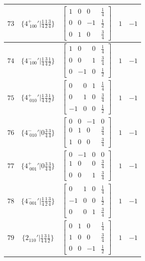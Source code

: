 \documentclass[fleqn,8pt]{jsarticle}
\begin{document}
\begin{longtable}{ccccc}
$ 73 $ & $ \{4^{+}_{\,\,100}{}'|\frac{1}{4} \frac{1}{2} \frac{3}{4}\} $ & $ \begin{bmatrix} 1 & 0 & 0 & \frac{1}{4} \\ 0 & 0 & -1 & \frac{1}{2} \\ 0 & 1 & 0 & \frac{3}{4} \end{bmatrix} $ & $ 1 $ & $ -1 $ \\ \hline
$ 74 $ & $ \{4^{-}_{\,\,100}{}'|\frac{1}{4} \frac{3}{4} \frac{1}{2}\} $ & $ \begin{bmatrix} 1 & 0 & 0 & \frac{1}{4} \\ 0 & 0 & 1 & \frac{3}{4} \\ 0 & -1 & 0 & \frac{1}{2} \end{bmatrix} $ & $ 1 $ & $ -1 $ \\ \hline
$ 75 $ & $ \{4^{+}_{\,\,010}{}'|\frac{1}{4} \frac{3}{4} \frac{1}{2}\} $ & $ \begin{bmatrix} 0 & 0 & 1 & \frac{1}{4} \\ 0 & 1 & 0 & \frac{3}{4} \\ -1 & 0 & 0 & \frac{1}{2} \end{bmatrix} $ & $ 1 $ & $ -1 $ \\ \hline
$ 76 $ & $ \{4^{-}_{\,\,010}{}'|0 \frac{3}{4} \frac{3}{4}\} $ & $ \begin{bmatrix} 0 & 0 & -1 & 0 \\ 0 & 1 & 0 & \frac{3}{4} \\ 1 & 0 & 0 & \frac{3}{4} \end{bmatrix} $ & $ 1 $ & $ -1 $ \\ \hline
$ 77 $ & $ \{4^{+}_{\,\,001}{}'|0 \frac{3}{4} \frac{3}{4}\} $ & $ \begin{bmatrix} 0 & -1 & 0 & 0 \\ 1 & 0 & 0 & \frac{3}{4} \\ 0 & 0 & 1 & \frac{3}{4} \end{bmatrix} $ & $ 1 $ & $ -1 $ \\ \hline
$ 78 $ & $ \{4^{-}_{\,\,001}{}'|\frac{1}{4} \frac{1}{2} \frac{3}{4}\} $ & $ \begin{bmatrix} 0 & 1 & 0 & \frac{1}{4} \\ -1 & 0 & 0 & \frac{1}{2} \\ 0 & 0 & 1 & \frac{3}{4} \end{bmatrix} $ & $ 1 $ & $ -1 $ \\ \hline
$ 79 $ & $ \{2{}_{110}{}'|\frac{1}{4} \frac{3}{4} \frac{1}{2}\} $ & $ \begin{bmatrix} 0 & 1 & 0 & \frac{1}{4} \\ 1 & 0 & 0 & \frac{3}{4} \\ 0 & 0 & -1 & \frac{1}{2} \end{bmatrix} $ & $ 1 $ & $ -1 $ \\ \hline

\end{longtable}
\end{document}
